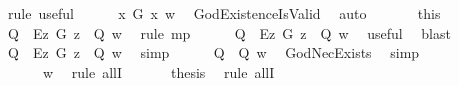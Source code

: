 \begin{isabellebody}
\ {\isacharparenleft}rule\ useful{\isacharparenright}\isanewline
\ \ \ \ \isamarkupfalse%
\ {\isachardoublequoteopen}{\isasymexists}x{\isachardot}\ G\ x\ w{\isachardoublequoteclose}\ \isamarkupfalse%
\ GodExistenceIsValid\ \isamarkupfalse%
\ auto\isanewline
\ \ \ \ \isamarkupfalse%
\ {}\ this\ \isamarkupfalse%
\ {\isachardoublequoteopen}{\isacharparenleft}Q\ \isactrlbold {\isasymrightarrow}\ \isactrlbold {\isasymbox}{\isacharparenleft}\isactrlbold {\isasymforall}\isactrlsup Ez{\isachardot}\ G\ z\ \isactrlbold {\isasymrightarrow}\ Q{\isacharparenright}{\isacharparenright}\ w{\isachardoublequoteclose}\ \isamarkupfalse%
\ {\isacharparenleft}rule\ mp{\isacharparenright}\isanewline
\ \ \ \ \isamarkupfalse%
\ {\isachardoublequoteopen}{\isacharparenleft}Q\ \isactrlbold {\isasymrightarrow}\ \isactrlbold {\isasymbox}{\isacharparenleft}{\isacharparenleft}\isactrlbold {\isasymexists}\isactrlsup Ez{\isachardot}\ G\ z{\isacharparenright}\ \isactrlbold {\isasymrightarrow}\ Q{\isacharparenright}{\isacharparenright}\ w{\isachardoublequoteclose}\ \isamarkupfalse%
\ useful\ \isamarkupfalse%
\ blast\isanewline
\ \ \ \ \isamarkupfalse%
\ {\isachardoublequoteopen}{\isacharparenleft}Q\ \isactrlbold {\isasymrightarrow}\ {\isacharparenleft}\isactrlbold {\isasymbox}{\isacharparenleft}\isactrlbold {\isasymexists}\isactrlsup Ez{\isachardot}\ G\ z{\isacharparenright}\ \isactrlbold {\isasymrightarrow}\ \isactrlbold {\isasymbox}Q{\isacharparenright}{\isacharparenright}\ w{\isachardoublequoteclose}\ \isamarkupfalse%
\ simp\isanewline
\ \ \ \ \isamarkupfalse%
\ {\isachardoublequoteopen}{\isacharparenleft}Q\ \isactrlbold {\isasymrightarrow}\ \isactrlbold {\isasymbox}Q{\isacharparenright}\ w{\isachardoublequoteclose}\ \isamarkupfalse%
\ GodNecExists\ \isamarkupfalse%
\ simp\isanewline
\ \ \ \isacommand{{\isacharbraceright}}\isamarkupfalse%
\isanewline
\ \ \isamarkupfalse%
\ {\isachardoublequoteopen}{\isacharparenleft}\isactrlbold {\isasymforall}{\isasymPhi}{\isachardot}\ {\isasymPhi}\ \isactrlbold {\isasymrightarrow}\ \isactrlbold {\isasymbox}\ {\isasymPhi}{\isacharparenright}\ w{\isachardoublequoteclose}\ \isamarkupfalse%
\ {\isacharparenleft}rule\ allI{\isacharparenright}\isanewline
\ \ \isacommand{{\isacharbraceright}}\isamarkupfalse%
\isanewline
\ \ \isamarkupfalse%
\ {\isacharquery}thesis\ \isamarkupfalse%
\ {\isacharparenleft}rule\ allI{\isacharparenright}\isanewline
{}\isamarkupfalse%
%
%
%
%
%
%
%
%
%
%
\end{isabellebody}%
